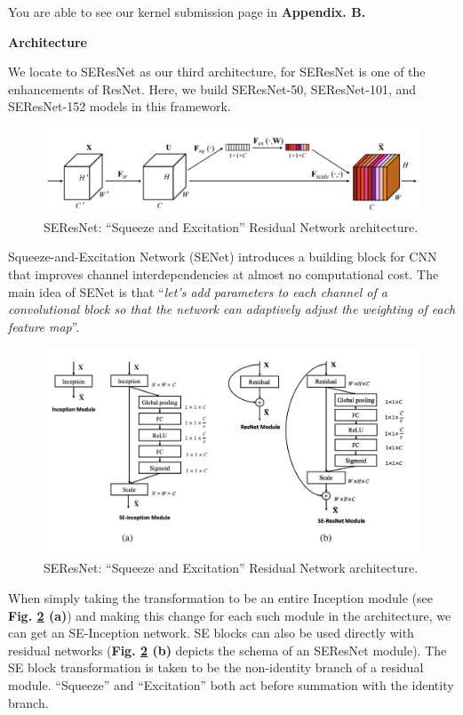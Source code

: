\documentclass[a4paper]{article}
\begin{document}
\large{You are able to see our kernel submission page in \textbf{Appendix. B.}}

\vspace{2mm}
\begin{center}
\large\textbf{Architecture} \\
\end{center}


\large{
We locate to \textsf{SEResNet} as our third architecture, for \textsf{SEResNet} is one of the enhancements of \textsf{ResNet}. Here, we build \textsf{SEResNet-50}, \textsf{SEResNet-101}, and \textsf{SEResNet-152} models in this framework.

\begin{figure}[h]
\centering
\includegraphics[width=15cm]{senet.png}
\caption{\textsf{SEResNet}: ``Squeeze and Excitation'' Residual Network architecture.}
\label{searc}
\end{figure}

Squeeze-and-Excitation Network (\textsf{SENet}) introduces a building block for CNN that improves channel interdependencies at almost no computational cost. The main idea of \textsf{SENet} is that ``\textit{let’s add parameters to each channel of a convolutional block so that the network can adaptively adjust the weighting of each feature map}''.

\begin{figure}[h]
\centering
\includegraphics[width=15cm]{seblock.pdf}
\caption{\textsf{SEResNet}: ``Squeeze and Excitation'' Residual Network architecture.}
\label{seblock}
\end{figure}

When simply taking the transformation to be an entire Inception module (see \textbf{Fig. \ref{seblock} (a)}) and making this change for each such module in the architecture, we can get an SE-Inception network. SE blocks can also be used directly with residual networks (\textbf{Fig. \ref{seblock} (b)} depicts the schema of an \textsf{SEResNet} module). The SE block transformation is taken to be the non-identity branch of a residual module. ``Squeeze'' and ``Excitation'' both act before summation with the identity branch.

}
\end{document}
